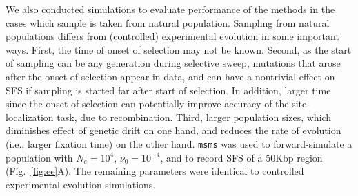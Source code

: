 We also conducted simulations to evaluate performance of the methods in the
cases which sample is taken from natural population. Sampling from natural 
populations differs from (controlled) experimental evolution in some important
ways. First, the time of onset of selection may not be known. Second, as the 
start of 
sampling can be any generation during selective sweep, mutations that arose 
after the onset of selection appear in data, and can have a nontrivial effect 
on SFS if sampling is started far after start of selection. In addition, larger 
time since the onset of selection can potentially improve accuracy of the 
site-localization task, due to recombination. Third, larger 
population sizes, which diminishes effect of genetic 
drift on one hand, and reduces the rate of evolution (i.e., larger fixation 
time) on the other hand. \texttt{msms} was used to
forward-simulate a population with $N_e=10^4$, $\nu_0=10^{-4}$, and to
record SFS of a 50Kbp region (Fig.~\ref{fig:ee}A). The remaining
parameters were identical to controlled experimental evolution simulations.

